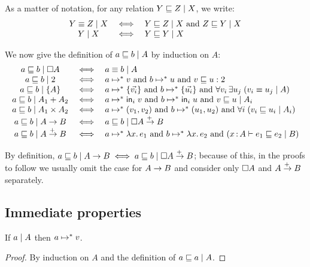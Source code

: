 \documentclass{article}
\renewcommand{\land}{~\text{and}~}
\begin{document}
As a matter of notation, for any relation $\lr{X}{Y \ale Z}$, we write:
\[\begin{array}{ccl}
  \lr{X}{Y \aeq Z} &\iff& \lr{X}{Y \ale Z} \land \lr{X}{Z \ale Y}\\
  \lr{X}{Y}     &\iff& \lr{X}{Y \ale Y}
\end{array}\]

We now give the definition of $\lr{A}{a \ale b}$ by induction on $A$:
\[\begin{array}{ccl}
  \lr{\disc{A}}{a \ale b} &\iff& \lr{A}{a \aeq b}\\
  \lr{\bool}{a \ale b} &\iff&
  a \steps v \land b \steps u \land v \ale u : \bool\\
  \lr{\Set{A}}{a \ale b} &\iff&
  a \steps \setlit{\vec{v_i}} \land b \steps \setlit{\vec{u_i}}
  \land \forall v_i\,\exists u_j\; (\lr{A}{v_i \aeq u_j})\\
  \lr{A_1 + A_2}{a \ale b} &\iff&
  a \steps \ms{in}_i\;v \land b \steps \ms{in}_i\;u \land \lr{A_i}{v \ale u}\\
  \lr{A_1 \x A_2}{a \ale b} &\iff&
  a \steps (v_1, v_2) \land b \steps (u_1, u_2)
  \land \forall i\; (\lr{A_i}{v_i \ale u_i})\\
  \lr{A \to B}{a \ale b} &\iff& \lr{\disc{A} \mto B}{a \ale b}\\
  \lr{A \mto B}{a \ale b} &\iff&
  a \steps \fn\bind{x} e_1 \land b \steps \fn\bind{x} e_2
  \land (\lrcx{x\of A}{B}{e_1 \ale e_2})
\end{array}\]

By definition, $\lr{A \uto B}{a \ale b} \iff \lr{\disc{A} \mto B}{a \ale b}$;
because of this, in the proofs to follow we usually omit the case for $A \uto B$
and consider only $\disc{A}$ and $A \mto B$ separately.


\subsection{Immediate properties}

\begin{theorem}[Termination]\label{thm:termination}
  If $\lr{A}{a}$ then $a \steps v$.
\end{theorem}

\begin{proof}
  By induction on $A$ and the definition of $\lr{A}{a \ale a}$.
\end{proof}
\end{document}
